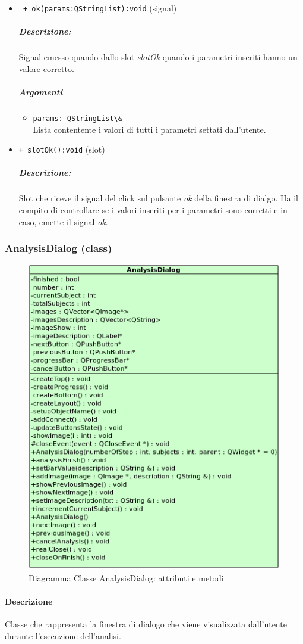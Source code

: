 \begin{itemize}
\item \color{blue}\verb! + ok(params:QStringList):void! (signal)
\color{black} 
\subparagraph{Descrizione:} Signal\g{} emesso quando dallo slot\g{} \emph{slotOk} quando i parametri inseriti hanno un valore corretto.
\subparagraph{Argomenti}
\begin{itemize}
\item \color{RoyalPurple} \verb!params: QStringList\& !\\ Lista contentente i valori di tutti i parametri settati dall'utente.
\end{itemize}

\item \color{blue}\verb!+ slotOk():void! (slot)
\color{black}
\subparagraph{Descrizione: }Slot\g{} che riceve il signal\g{} del click sul pulsante \emph{ok} della finestra di dialgo. Ha il compito di controllare se i valori inseriti per i parametri sono corretti e in caso, emette il signal\g{} \emph{ok}.\\ 
\end{itemize}
\color{black}
\pagebreak
\subsubsection{AnalysisDialog (class)}
\label{speAnaD}
\begin{figure}[!h]
\centering
			\includegraphics[width=0.6\linewidth] {./Content/Immagini/view/AnalysisDialog.png}
			\caption{Diagramma Classe AnalysisDialog: attributi e metodi}
			\label{cl_anaDia}
\end{figure}
\paragraph{Descrizione \\}
Classe che rappresenta la finestra di dialogo che viene visualizzata dall'utente durante l'esecuzione dell'analisi.
